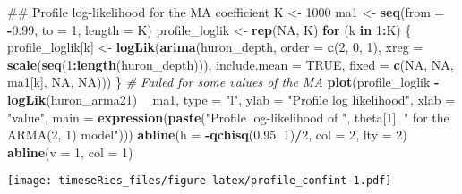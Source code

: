 \documentclass[]{book}
\newenvironment{Shaded}{\begin{snugshade}}{\end{snugshade}}
\newcommand{\KeywordTok}[1]{\textcolor[rgb]{0.13,0.29,0.53}{\textbf{#1}}}
\newcommand{\DataTypeTok}[1]{\textcolor[rgb]{0.13,0.29,0.53}{#1}}
\newcommand{\DecValTok}[1]{\textcolor[rgb]{0.00,0.00,0.81}{#1}}
\newcommand{\FloatTok}[1]{\textcolor[rgb]{0.00,0.00,0.81}{#1}}
\newcommand{\StringTok}[1]{\textcolor[rgb]{0.31,0.60,0.02}{#1}}
\newcommand{\CommentTok}[1]{\textcolor[rgb]{0.56,0.35,0.01}{\textit{#1}}}
\newcommand{\OtherTok}[1]{\textcolor[rgb]{0.56,0.35,0.01}{#1}}
\newcommand{\ControlFlowTok}[1]{\textcolor[rgb]{0.13,0.29,0.53}{\textbf{#1}}}
\newcommand{\OperatorTok}[1]{\textcolor[rgb]{0.81,0.36,0.00}{\textbf{#1}}}
\newcommand{\NormalTok}[1]{#1}
\begin{document}
\begin{Shaded}
\begin{Highlighting}[]
\NormalTok{## Profile log-likelihood for the MA coefficient}
\NormalTok{K <-}\StringTok{ }\DecValTok{1000}
\NormalTok{ma1 <-}\StringTok{ }\KeywordTok{seq}\NormalTok{(}\DataTypeTok{from =} \OperatorTok{-}\FloatTok{0.99}\NormalTok{, }\DataTypeTok{to =} \DecValTok{1}\NormalTok{, }\DataTypeTok{length =}\NormalTok{ K)}
\NormalTok{profile_loglik <-}\StringTok{ }\KeywordTok{rep}\NormalTok{(}\OtherTok{NA}\NormalTok{, K)}
\ControlFlowTok{for}\NormalTok{ (k }\ControlFlowTok{in} \DecValTok{1}\OperatorTok{:}\NormalTok{K) \{}
\NormalTok{    profile_loglik[k] <-}\StringTok{ }\KeywordTok{logLik}\NormalTok{(}\KeywordTok{arima}\NormalTok{(huron_depth, }\DataTypeTok{order =} \KeywordTok{c}\NormalTok{(}\DecValTok{2}\NormalTok{, }\DecValTok{0}\NormalTok{, }\DecValTok{1}\NormalTok{), }\DataTypeTok{xreg =} \KeywordTok{scale}\NormalTok{(}\KeywordTok{seq}\NormalTok{(}\DecValTok{1}\OperatorTok{:}\KeywordTok{length}\NormalTok{(huron_depth))), }
        \DataTypeTok{include.mean =} \OtherTok{TRUE}\NormalTok{, }\DataTypeTok{fixed =} \KeywordTok{c}\NormalTok{(}\OtherTok{NA}\NormalTok{, }\OtherTok{NA}\NormalTok{, ma1[k], }\OtherTok{NA}\NormalTok{, }\OtherTok{NA}\NormalTok{)))}
\NormalTok{\}}
\CommentTok{# Failed for some values of the MA}
\KeywordTok{plot}\NormalTok{(profile_loglik }\OperatorTok{-}\StringTok{ }\KeywordTok{logLik}\NormalTok{(huron_arma21) }\OperatorTok{~}\StringTok{ }\NormalTok{ma1, }\DataTypeTok{type =} \StringTok{"l"}\NormalTok{, }\DataTypeTok{ylab =} \StringTok{"Profile log likelihood"}\NormalTok{, }
    \DataTypeTok{xlab =} \StringTok{"value"}\NormalTok{, }\DataTypeTok{main =} \KeywordTok{expression}\NormalTok{(}\KeywordTok{paste}\NormalTok{(}\StringTok{"Profile log-likelihood of "}\NormalTok{, theta[}\DecValTok{1}\NormalTok{], }
        \StringTok{" for the ARMA(2, 1) model"}\NormalTok{)))}
\KeywordTok{abline}\NormalTok{(}\DataTypeTok{h =} \OperatorTok{-}\KeywordTok{qchisq}\NormalTok{(}\FloatTok{0.95}\NormalTok{, }\DecValTok{1}\NormalTok{)}\OperatorTok{/}\DecValTok{2}\NormalTok{, }\DataTypeTok{col =} \DecValTok{2}\NormalTok{, }\DataTypeTok{lty =} \DecValTok{2}\NormalTok{)}
\KeywordTok{abline}\NormalTok{(}\DataTypeTok{v =} \DecValTok{1}\NormalTok{, }\DataTypeTok{col =} \DecValTok{1}\NormalTok{)}
\end{Highlighting}
\end{Shaded}

\texttt{[image: timeseRies\_files/figure-latex/profile\_confint-1.pdf]}
\end{document}
